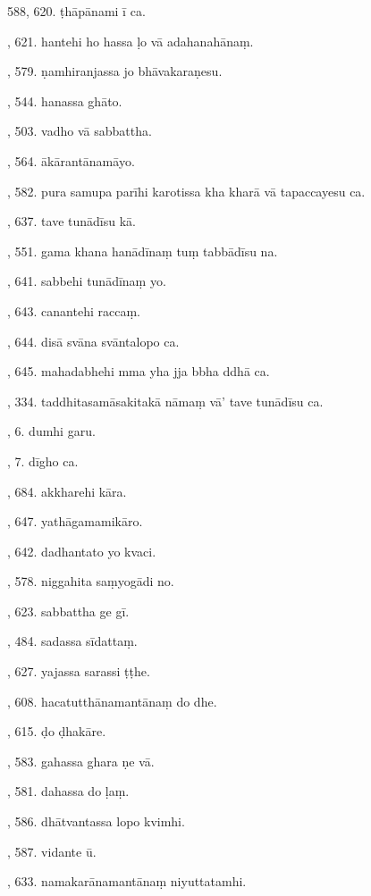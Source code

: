 588, 620. ṭhāpānami ī ca.\par {}, 621. hantehi ho hassa ḷo vā adahanahānaṃ.\par {}, 579. ṇamhiranjassa jo bhāvakaraṇesu.\par {}, 544. hanassa ghāto.\par {}, 503. vadho vā sabbattha.\par {}, 564. ākārantānamāyo.\par {}, 582. pura samupa parīhi karotissa kha kharā vā tapaccayesu ca.\par {}, 637. tave tunādīsu kā.\par {}, 551. gama khana hanādīnaṃ tuṃ tabbādīsu na.\par {}, 641. sabbehi tunādīnaṃ yo.\par {}, 643. canantehi raccaṃ.\par {}, 644. disā svāna svāntalopo ca.\par {}, 645. mahadabhehi mma yha jja bbha ddhā ca.\par {}, 334. taddhitasamāsakitakā nāmaṃ vā’ tave tunādīsu ca.\par {}, 6. dumhi garu.\par {}, 7. dīgho ca.\par {}, 684. akkharehi kāra.\par {}, 647. yathāgamamikāro.\par {}, 642. dadhantato yo kvaci.\par {}, 578. niggahita saṃyogādi no.\par {}, 623. sabbattha ge gī.\par {}, 484. sadassa sīdattaṃ.\par {}, 627. yajassa sarassi ṭṭhe.\par {}, 608. hacatutthānamantānaṃ do dhe.\par {}, 615. ḍo ḍhakāre.\par {}, 583. gahassa ghara ṇe vā.\par {}, 581. dahassa do ḷaṃ.\par {}, 586. dhātvantassa lopo kvimhi.\par {}, 587. vidante ū.\par {}, 633. namakarānamantānaṃ niyuttatamhi.\par \noindent
